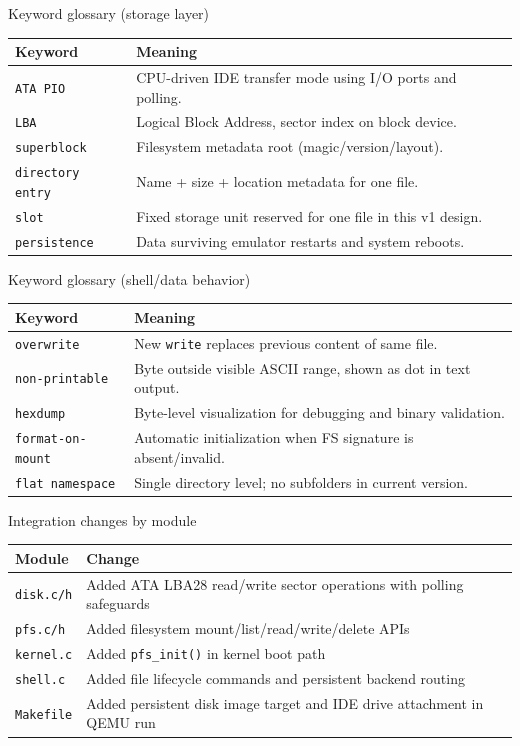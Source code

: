 \documentclass[aspectratio=169]{beamer}
\begin{document}
\begin{frame}{Keyword glossary (storage layer)}
  \small
  \begin{tabular}{@{}p{3.0cm}p{9.0cm}@{}}
    \toprule
    \textbf{Keyword} & \textbf{Meaning} \\
    \midrule
    \texttt{ATA PIO} & CPU-driven IDE transfer mode using I/O ports and polling. \\
    \texttt{LBA} & Logical Block Address, sector index on block device. \\
    \texttt{superblock} & Filesystem metadata root (magic/version/layout). \\
    \texttt{directory entry} & Name + size + location metadata for one file. \\
    \texttt{slot} & Fixed storage unit reserved for one file in this v1 design. \\
    \texttt{persistence} & Data surviving emulator restarts and system reboots. \\
    \bottomrule
  \end{tabular}
\end{frame}

\begin{frame}{Keyword glossary (shell/data behavior)}
  \small
  \begin{tabular}{@{}p{3.0cm}p{9.0cm}@{}}
    \toprule
    \textbf{Keyword} & \textbf{Meaning} \\
    \midrule
    \texttt{overwrite} & New \texttt{write} replaces previous content of same file. \\
    \texttt{non-printable} & Byte outside visible ASCII range, shown as dot in text output. \\
    \texttt{hexdump} & Byte-level visualization for debugging and binary validation. \\
    \texttt{format-on-mount} & Automatic initialization when FS signature is absent/invalid. \\
    \texttt{flat namespace} & Single directory level; no subfolders in current version. \\
    \bottomrule
  \end{tabular}
\end{frame}

\begin{frame}{Integration changes by module}
  \small
  \begin{tabular}{@{}p{2.8cm}p{9.2cm}@{}}
    \toprule
    \textbf{Module} & \textbf{Change} \\
    \midrule
    \texttt{disk.c/h} & Added ATA LBA28 read/write sector operations with polling safeguards \\
    \texttt{pfs.c/h} & Added filesystem mount/list/read/write/delete APIs \\
    \texttt{kernel.c} & Added \texttt{pfs\_init()} in kernel boot path \\
    \texttt{shell.c} & Added file lifecycle commands and persistent backend routing \\
    \texttt{Makefile} & Added persistent disk image target and IDE drive attachment in QEMU run \\
    \bottomrule
  \end{tabular}
\end{frame}
\end{document}
